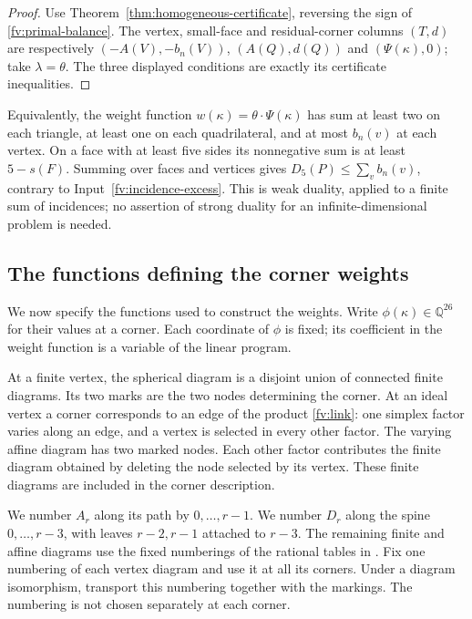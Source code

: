 \documentclass[11pt]{article}
\theoremstyle{definition}
\theoremstyle{remark}
\numberwithin{equation}{section}
\newcommand{\Q}{\mathbb Q}
\begin{document}
\begin{proof}
Use Theorem~\ref{thm:homogeneous-certificate}, reversing the sign of
\eqref{fv:primal-balance}. The vertex, small-face and residual-corner
columns $(T,d)$ are respectively $(-A(V),-b_n(V))$,
$(A(Q),d(Q))$ and $(\Psi(\kappa),0)$; take $\lambda=\theta$.
The three displayed conditions are exactly its certificate inequalities.
\end{proof}

Equivalently, the weight function
$w(\kappa)=\theta\cdot\Psi(\kappa)$ has sum at least two on each
triangle, at least one on each quadrilateral, and at most $b_n(v)$
at each vertex. On a face with at least five sides its nonnegative
sum is at least $5-s(F)$. Summing over faces and vertices gives
$D_5(P)\le\sum_vb_n(v)$, contrary to
Input~\ref{fv:incidence-excess}. This is weak duality, applied to a
finite sum of incidences; no assertion of strong duality for an
infinite-dimensional problem is needed.

\subsection{The functions defining the corner weights}
\label{fv:features}

We now specify the functions used to construct the weights. Write
$\phi(\kappa)\in\Q^{26}$ for their values at a corner. Each
coordinate of $\phi$ is fixed; its coefficient in the weight function
is a variable of the linear program.

At a finite vertex, the spherical diagram is a disjoint union of
connected finite diagrams. Its two marks are the two nodes determining
the corner. At an ideal vertex a corner corresponds to an edge of
the product \eqref{fv:link}: one simplex factor varies along an edge,
and a vertex is selected in every other factor. The varying affine
diagram has two marked nodes. Each other factor contributes the finite
diagram obtained by deleting the node selected by its vertex. These
finite diagrams are included in the corner description.

We number $A_r$ along its path by $0,\ldots,r-1$. We number $D_r$
along the spine $0,\ldots,r-3$, with leaves $r-2,r-1$ attached to
$r-3$. The remaining finite and affine diagrams use the fixed
numberings of the rational tables in \cite{BoundsSupplement}.
Fix one numbering of each vertex diagram and use it at all its
corners. Under a diagram isomorphism, transport this numbering
together with the markings. The numbering is not chosen separately
at each corner.
\end{document}
